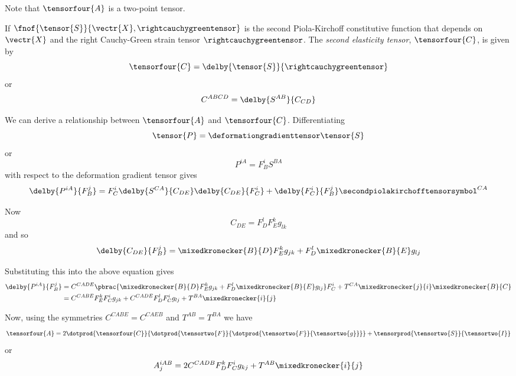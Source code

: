 Note that $\tensorfour{A}$ is a two-point tensor. 

If $\fnof{\tensor{S}}{\vectr{X},\rightcauchygreentensor}$ is the second Piola-Kirchoff
constitutive function that depends on $\vectr{X}$ and the right Cauchy-Green
strain tensor $\rightcauchygreentensor$. The \emph{second elasticity tensor},
$\tensorfour{C}$, is given by 
\begin{equation}
  \tensorfour{C}=\delby{\tensor{S}}{\rightcauchygreentensor}
\end{equation}
or
\begin{equation}
  C^{ABCD}=\delby{S^{AB}}{C_{CD}}
\end{equation}

We can derive a relationship between $\tensorfour{A}$ and $\tensorfour{C}$. Differentiating
\begin{equation}
  \tensor{P}=\deformationgradienttensor\tensor{S}
\end{equation}
or
\begin{equation}
  P^{iA}=F^{i}_{B}S^{BA}
\end{equation}
with respect to the deformation gradient tensor gives
\begin{equation}
  \delby{P^{iA}}{F^{j}_{B}}=F^{i}_{C}\delby{S^{CA}}{C_{DE}}\delby{C_{DE}}{F^{i}_{C}}+\delby{F^{i}_{C}}{F^{j}_{B}}\secondpiolakirchofftensorsymbol^{CA}
\end{equation}

Now
\begin{equation}
  C_{DE}=F^{l}_{D}F^{k}_{E}g_{lk}
\end{equation}
and so
\begin{equation}
  \delby{C_{DE}}{F^{j}_{B}}=\mixedkronecker{B}{D}F^{k}_{E}g_{jk}+F^{l}_{D}\mixedkronecker{B}{E}g_{lj}
\end{equation}

Substituting this into the above equation gives
\begin{equation}
  \begin{split}
    \delby{P^{iA}}{F^{j}_{B}}&=C^{CADE}\pbrac{\mixedkronecker{B}{D}F^{k}_{E}g_{jk}+
      F^{l}_{D}\mixedkronecker{B}{E}g_{lj}}F^{i}_{C}+T^{CA}\mixedkronecker{j}{i}\mixedkronecker{B}{C}\\
    &=C^{CABE}F^{k}_{E}F^{i}_{C}g_{jk}+C^{CADE}F^{l}_{D}F^{i}_{C}g_{lj}+T^{BA}\mixedkronecker{i}{j}
  \end{split}
\end{equation}

Now, using the symmetries $C^{CABE}=C^{CAEB}$ and $T^{AB}=T^{BA}$ we have
\begin{equation}
  \tensorfour{A}=2\dotprod{\tensorfour{C}}{\dotprod{\tensortwo{F}}{\dotprod{\tensortwo{F}}{\tensortwo{g}}}}+
  \tensorprod{\tensortwo{S}}{\tensortwo{I}}
\end{equation}
or
\begin{equation}
  A^{iAB}_{j}=2C^{CADB}F^{k}_{D}F^{i}_{C}g_{kj}+T^{AB}\mixedkronecker{i}{j}
\end{equation}

